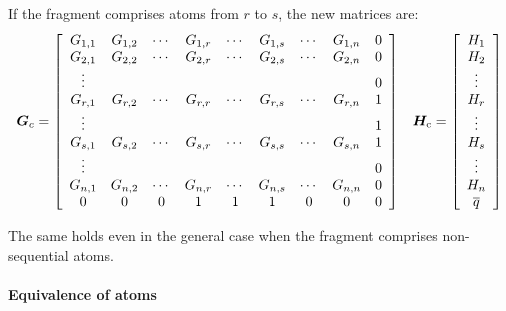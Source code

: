 \documentclass[a4paper]{report}
\newcommand{\bs}{\boldsymbol}
\newcommand{\mr}{\mathrm}
\begin{document}
If the fragment comprises atoms from $r$ to $s$, the new matrices are:
\begin{equation}
\bs{G}_c = \left[ \begin{array}{ccccccccc} 
G_{1,1} & G_{1,2} & \cdots & G_{1,r} & \cdots & G_{1,s} & \cdots & G_{1,n} & 0 \\
G_{2,1} & G_{2,2} & \cdots & G_{2,r} & \cdots & G_{2,s} & \cdots & G_{2,n} & 0 \\
\vdots  &         &        &         &        &         &        &         & 0 \\
G_{r,1} & G_{r,2} & \cdots & G_{r,r} & \cdots & G_{r,s} & \cdots & G_{r,n} & 1 \\
\vdots  &         &        &         &        &         &        &         & 1 \\
G_{s,1} & G_{s,2} & \cdots & G_{s,r} & \cdots & G_{s,s} & \cdots & G_{s,n} & 1 \\
\vdots  &         &        &         &        &         &        &         & 0 \\
G_{n,1} & G_{n,2} & \cdots & G_{n,r} & \cdots & G_{n,s} & \cdots & G_{n,n} & 0 \\
0       & 0       & 0      & 1       & 1      & 1       & 0      & 0       & 0 \\
\end{array} \right] \hspace{0.3cm} \bs{H}_\mr{c} = \left[ \begin{array}{c} H_1 \\ H_2 \\ \vdots \\ H_r \\ \vdots \\ H_s \\ \vdots \\ H_n \\ \overline{q} \end{array} \right]
\end{equation}

The same holds even in the general case when the fragment comprises non-sequential
atoms.

\paragraph{Equivalence of atoms}
\end{document}
